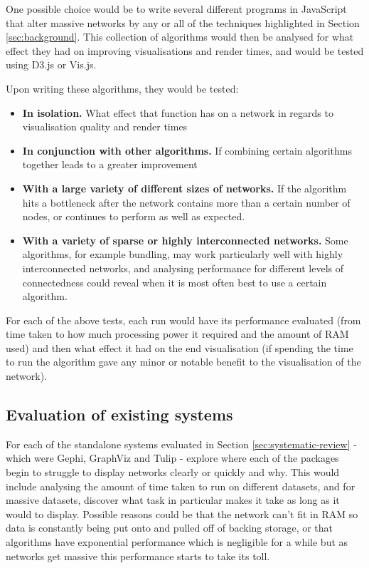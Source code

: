 \documentclass[../dissertation.tex]{subfiles}
\begin{document}
One possible choice would be to write several different programs in JavaScript that alter massive networks by any or all of the techniques highlighted in Section \ref{sec:background}. This collection of algorithms would then be analysed for what effect they had on improving visualisations and render times, and would be tested using D3.js or Vis.js. 

Upon writing these algorithms, they would be tested:
\begin{itemize}
    \item \textbf{In isolation.} What effect that function has on a network in regards to visualisation quality and render times
    \item \textbf{In conjunction with other algorithms.} If combining certain algorithms together leads to a greater improvement
    \item\textbf{ With a large variety of different sizes of networks.} If the algorithm hits a bottleneck after the network contains more than a certain number of nodes, or continues to perform as well as expected.
    \item \textbf{With a variety of sparse or highly interconnected networks.} Some algorithms, for example bundling, may work particularly well with highly interconnected networks, and analysing performance for different levels of connectedness could reveal when it is most often best to use a certain algorithm.
\end{itemize}

For each of the above tests, each run would have its performance evaluated (from time taken to how much processing power it required and the amount of RAM used) and then what effect it had on the end visualisation (if spending the time to run the algorithm gave any minor or notable benefit to the visualisation of the network).

\subsection{Evaluation of existing systems}

For each of the standalone systems evaluated in Section \ref{sec:systematic-review} - which were Gephi, GraphViz and Tulip - explore where each of the packages begin to struggle to display networks clearly or quickly and why. This would include analysing the amount of time taken to run on different datasets, and for massive datasets, discover what task in particular makes it take as long as it would to display. Possible reasons could be that the network can't fit in RAM so data is constantly being put onto and pulled off of backing storage, or that algorithms have exponential performance which is negligible for a while but as networks get massive this performance starts to take its toll. 
\end{document}
